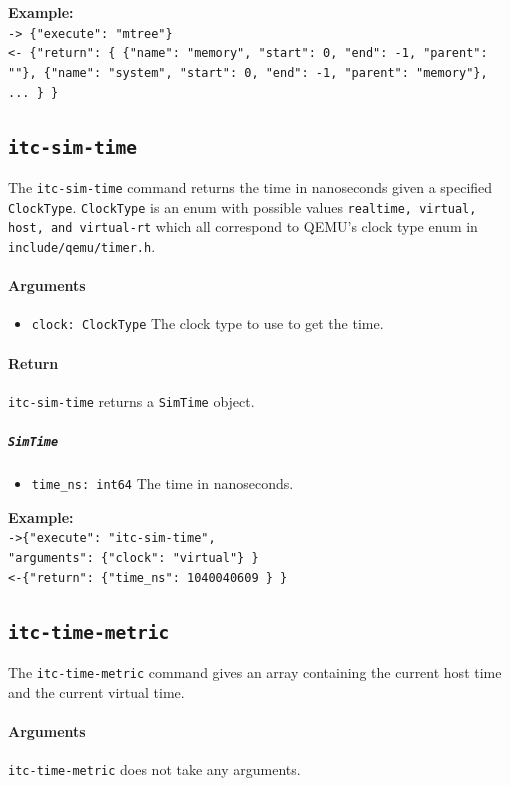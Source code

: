 \documentclass{article}
\newcommand{\code}[1]{\texttt{#1}}
\begin{document}
\textbf{Example:}\\
\code{-> \{"execute": "mtree"\}} \\
\code{<- \{"return": \{ \{"name": "memory", "start": 0, "end": -1, "parent": ""\}, \{"name": "system", "start": 0, "end": -1, "parent": "memory"\}, ... \} \}}

\subsection{\code{itc-sim-time}}
The \code{itc-sim-time} command returns the time in nanoseconds given a specified \code{ClockType}. \code{ClockType} is an enum with possible values \code{realtime, virtual, host, and virtual-rt} which all correspond to QEMU's clock type enum in \code{include/qemu/timer.h}.

\paragraph{Arguments}
\begin{itemize}
    \item \code{clock: ClockType}
        \subitem The clock type to use to get the time.
\end{itemize}

\paragraph{Return} \code{itc-sim-time} returns a \code{SimTime} object.
\subparagraph{\code{SimTime}}
\begin{itemize}
    \item \code{time\_ns: int64}
    \subitem The time in nanoseconds.
\end{itemize}

\textbf{Example:}\\
\code{->\{"execute": "itc-sim-time",}\\
\code{"arguments": \{"clock": "virtual"\} \}}\\
\code{<-\{"return": \{"time\_ns": 1040040609 \} \}}

\subsection{\code{itc-time-metric}}
The \code{itc-time-metric} command gives an array containing the current host time and the current virtual time.

\paragraph{Arguments} \code{itc-time-metric} does not take any arguments.
\end{document}
